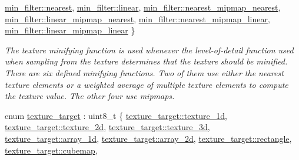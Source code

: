 \begin{DoxyCompactItemize}
\mbox{\hyperlink{namespacemoka_afeea6a53d61ee8561c91c62f5a051a77ad879c351426770bc0b13c3628db1e636}{min\+\_\+filter\+::nearest}}, 
\mbox{\hyperlink{namespacemoka_afeea6a53d61ee8561c91c62f5a051a77a9a932b3cb396238423eb2f33ec17d6aa}{min\+\_\+filter\+::linear}}, 
\newline
\mbox{\hyperlink{namespacemoka_afeea6a53d61ee8561c91c62f5a051a77a250bf16c3da0b23fd429f9ee3beaad82}{min\+\_\+filter\+::nearest\+\_\+mipmap\+\_\+nearest}}, 
\mbox{\hyperlink{namespacemoka_afeea6a53d61ee8561c91c62f5a051a77a6a86be4e956a2dad5b8fcbf557b144cc}{min\+\_\+filter\+::linear\+\_\+mipmap\+\_\+nearest}}, 
\mbox{\hyperlink{namespacemoka_afeea6a53d61ee8561c91c62f5a051a77aad58f1ac69ffd6aad90f37b79c187806}{min\+\_\+filter\+::nearest\+\_\+mipmap\+\_\+linear}}, 
\mbox{\hyperlink{namespacemoka_afeea6a53d61ee8561c91c62f5a051a77a1bdd53f0fc057644ac46aa6a083d316f}{min\+\_\+filter\+::linear\+\_\+mipmap\+\_\+linear}}
 \}
\begin{DoxyCompactList}\small\item\em The texture minifying function is used whenever the level-\/of-\/detail function used when sampling from the texture determines that the texture should be minified. There are six defined minifying functions. Two of them use either the nearest texture elements or a weighted average of multiple texture elements to compute the texture value. The other four use mipmaps. \end{DoxyCompactList}\item 
enum \mbox{\hyperlink{namespacemoka_a259bf395c8f07bd8d13515efcb542623}{texture\+\_\+target}} \+: uint8\+\_\+t \{ \newline
\mbox{\hyperlink{namespacemoka_a259bf395c8f07bd8d13515efcb542623a438a533af2d646c9803e5e75c98b19a6}{texture\+\_\+target\+::texture\+\_\+1d}}, 
\mbox{\hyperlink{namespacemoka_a259bf395c8f07bd8d13515efcb542623ade86992194d08494a0a0e208a3660f31}{texture\+\_\+target\+::texture\+\_\+2d}}, 
\mbox{\hyperlink{namespacemoka_a259bf395c8f07bd8d13515efcb542623a26ba8c38820156a8b149b8f6fdf61520}{texture\+\_\+target\+::texture\+\_\+3d}}, 
\mbox{\hyperlink{namespacemoka_a259bf395c8f07bd8d13515efcb542623a5609f52155b2dcd93a3d1695e5dc153e}{texture\+\_\+target\+::array\+\_\+1d}}, 
\newline
\mbox{\hyperlink{namespacemoka_a259bf395c8f07bd8d13515efcb542623a91edcc7de88cd1fc35873ad7df605e09}{texture\+\_\+target\+::array\+\_\+2d}}, 
\mbox{\hyperlink{namespacemoka_a259bf395c8f07bd8d13515efcb542623ad98492c62533926b6961f41406756a4e}{texture\+\_\+target\+::rectangle}}, 
\mbox{\hyperlink{namespacemoka_a259bf395c8f07bd8d13515efcb542623a63469dd37fd256264ad46c84e2ff6986}{texture\+\_\+target\+::cubemap}}, 

\end{DoxyCompactItemize}
